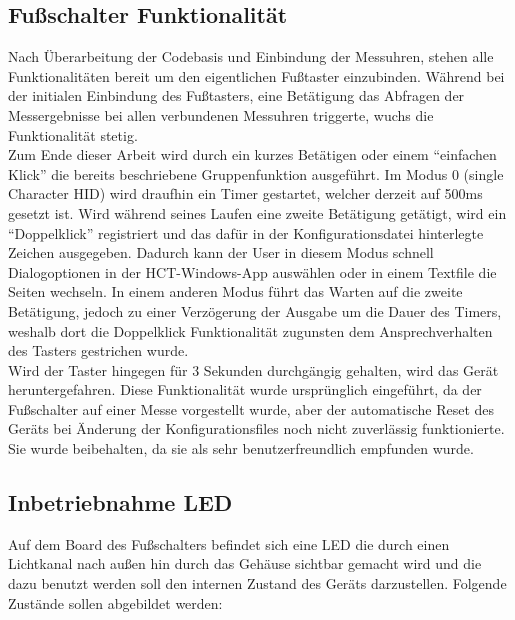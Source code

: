 \subsection{Fußschalter Funktionalität}
Nach Überarbeitung der Codebasis und Einbindung der Messuhren, stehen alle Funktionalitäten bereit um den eigentlichen Fußtaster einzubinden. Während bei der initialen Einbindung des Fußtasters, eine Betätigung das Abfragen der Messergebnisse bei allen verbundenen Messuhren triggerte, wuchs die Funktionalität stetig.\\
Zum Ende dieser Arbeit wird durch ein kurzes Betätigen oder einem ``einfachen Klick'' die bereits beschriebene Gruppenfunktion ausgeführt. Im Modus 0 (single Character HID) wird draufhin ein Timer gestartet, welcher derzeit auf 500ms gesetzt ist. Wird während seines Laufen eine zweite Betätigung getätigt, wird ein ``Doppelklick'' registriert und das dafür in der Konfigurationsdatei hinterlegte Zeichen ausgegeben. Dadurch kann der User in diesem Modus schnell Dialogoptionen in der HCT-Windows-App auswählen oder in einem Textfile die Seiten wechseln. In einem anderen Modus führt das Warten auf die zweite Betätigung, jedoch zu einer Verzögerung der Ausgabe um die Dauer des Timers, weshalb dort die Doppelklick Funktionalität zugunsten dem Ansprechverhalten des Tasters gestrichen wurde.\\
Wird der Taster hingegen für 3 Sekunden durchgängig gehalten, wird das Gerät heruntergefahren. Diese Funktionalität wurde ursprünglich eingeführt, da der Fußschalter auf einer Messe vorgestellt wurde, aber der automatische Reset des Geräts bei Änderung der Konfigurationsfiles noch nicht zuverlässig funktionierte. Sie wurde beibehalten, da sie als sehr benutzerfreundlich empfunden wurde.

\subsection{Inbetriebnahme LED}
Auf dem Board des Fußschalters befindet sich eine LED die durch einen Lichtkanal nach außen hin durch das Gehäuse sichtbar gemacht wird und die dazu benutzt werden soll den internen Zustand des Geräts darzustellen. Folgende Zustände sollen abgebildet werden: 

